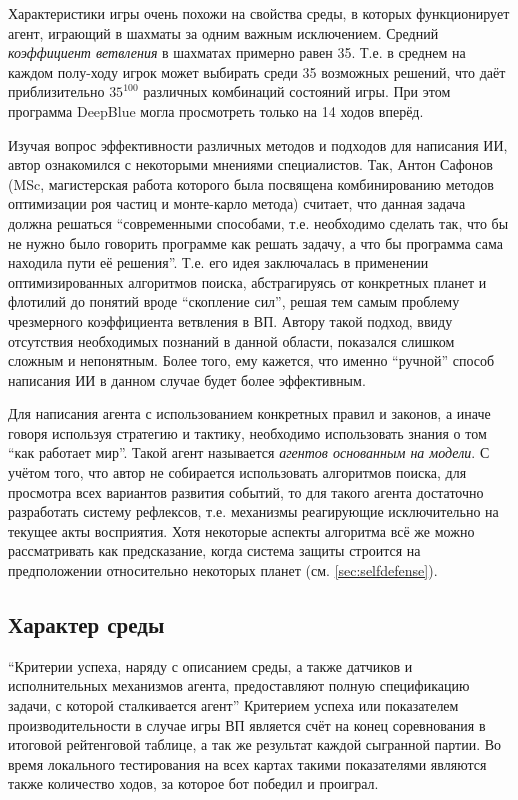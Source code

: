 \documentclass[12pt]{report}
\begin{document}
Характеристики игры очень похожи на свойства среды, в которых функционирует агент, играющий в шахматы за одним важным исключением. Средний \emph{коэффициент ветвления} в шахматах примерно равен 35. Т.е. в среднем на каждом полу-ходу игрок может выбирать среди 35 возможных решений, что даёт приблизительно $35^{100}$ различных комбинаций состояний игры. \citep{russell1995} При этом программа DeepBlue могла просмотреть только на 14 ходов вперёд. 

Изучая вопрос эффективности различных методов и подходов для написания ИИ, автор ознакомился с некоторыми мнениями специалистов. Так, Антон Сафонов (MSc, магистерская работа которого была посвящена комбинированию методов оптимизации роя частиц и монте-карло метода) считает, что данная задача должна решаться ``современными способами, т.е. необходимо сделать так, что бы не нужно было говорить программе как решать задачу, а что бы программа сама находила пути её решения''. Т.е. его идея заключалась в применении оптимизированных алгоритмов поиска, абстрагируясь от конкретных планет и флотилий до понятий вроде ``скопление сил'', решая тем самым проблему чрезмерного коэффициента ветвления в ВП. Автору такой подход, ввиду отсутствия необходимых познаний в данной области, показался слишком сложным и непонятным. Более того, ему кажется, что именно ``ручной'' способ написания ИИ в данном случае будет более эффективным.

Для написания агента с использованием конкретных правил и законов, а иначе говоря используя стратегию и тактику, необходимо использовать знания о том ``как работает мир''. Такой агент называется \emph{агентов основанным на модели}. \citep{russell1995} С учётом того, что автор не собирается использовать алгоритмов поиска, для просмотра всех вариантов развития событий, то для такого агента достаточно разработать систему рефлексов, т.е. механизмы реагирующие исключительно на текущее акты восприятия. Хотя некоторые аспекты алгоритма всё же можно рассматривать как предсказание, когда система защиты строится на предположении относительно некоторых планет (см. \ref{sec:selfdefense}).



\subsection{Характер среды}
``Критерии успеха, наряду с описанием среды, а также датчиков и исполнительных механизмов агента, предоставляют полную спецификацию задачи, с которой сталкивается агент'' \citep{russell1995} Критерием успеха или показателем производительности в случае игры ВП является счёт на конец соревнования в итоговой рейтенговой таблице, а так же результат каждой сыгранной партии. Во время локального тестирования на всех картах такими показателями являются также количество ходов, за которое бот победил и проиграл.
\end{document}
